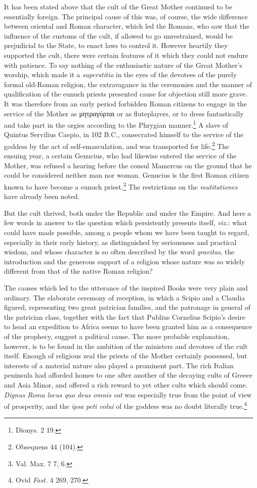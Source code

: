 \documentclass[a4paper, 11pt, oneside, polutonikogreek, english]{article}
\begin{document}
It has been stated above that the cult of the Great Mother continued to be essentially foreign. The principal cause of this was, of course, the wide difference between oriental and Roman character, which led the Romans, who saw that the influence of the customs of the cult, if allowed to go unrestrained, would be prejudicial to the State, to enact laws to control it. However heartily they supported the cult, there were certain features of it which they could not endure with patience. To say nothing of the enthusiastic nature of the Great Mother's worship, which made it a \emph{superstitio} in the eyes of the devotees of the purely formal old-Roman religion, the extravagance in the ceremonies and the manner of qualification of the eunuch priests presented cause for objection still more grave. It was therefore from an early period forbidden Roman citizens to engage in the service of the Mother as μητραγύρται or as fluteplayers, or to dress fantastically and take part in the orgies according to the Phrygian manner.\footnote{Dionys. 2 19.} A slave of Quintus Servilius Caepio, in 102 \textsc{B.C.}, consecrated himself to the service of the goddess by the act of self-emasculation, and was transported for life.\footnote{Obsequens 44 (104).} The ensuing year, a certain Genucius, who had likewise entered the service of the Mother, was refused a hearing before the consul Mamercus on the ground that he could be considered neither man nor woman. Genucius is the first Roman citizen known to have become a eunuch priest.\footnote{Val. Max. 7 7, 6.} The restrictions on the \emph{mutitationes} have already been noted.

But the cult thrived, both under the Republic and under the Empire. And here a few words in answer to the question which persistently presents itself, \emph{viz.}: what could have made possible, among a people whom we have been taught to regard, especially in their early history, as distinguished by seriousness and practical wisdom, and whose character is so often described by the word \emph{gravitas}, the introduction and the generous support of a religion whose nature was so widely different from that of the native Roman religion?

The causes which led to the utterance of the inspired Books were very plain and ordinary. The elaborate ceremony of reception, in which a Scipio and a Claudia figured, representing two great patrician families, and the patronage in general of the patrician class, together with the fact that Publius Cornelius Scipio's desire to head an expedition to Africa seems to have been granted him as a consequence of the prophecy, suggest a political cause. The more probable explanation, however, is to be found in the ambition of the ministers and devotees of the cult itself. Enough of religious zeal the priests of the Mother certainly possessed, but interests of a material nature also played a prominent part. The rich Italian peninsula had afforded homes to one after another of the decaying cults of Greece and Asia Minor, and offered a rich reward to yet other cults which should come. \emph{Dignus Roma locus quo deus omnis eat} was especially true from the point of view of prosperity, and the \emph{ipsa peti volui} of the goddess was no doubt literally true.\footnote{Ovid \emph{Fast.} 4 269, 270.}
\end{document}
